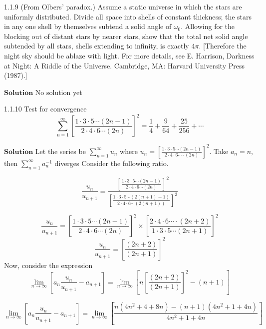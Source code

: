 \begin{mybox}{1.1.9}
(From Olbers' paradox.) Assume a static universe in which the stars are uniformly distributed. Divide all space into shells of constant thickness; the stars in any one shell by themselves subtend a solid angle of $\omega_{0}$. Allowing for the blocking out of distant stars by nearer stars, show that the total net solid angle subtended by all stars, shells extending to infinity, is exactly $4 \pi$. [Therefore the night sky should be ablaze with light. For more details, see E. Harrison, Darkness at Night: A Riddle of the Universe. Cambridge, MA: Harvard University Press (1987).]
\end{mybox}


$\boxed{\textbf{Solution}}$ No solution yet

\newpage



\begin{mybox}{1.1.10}
Test for convergence
$$
\sum_{n=1}^{\infty}\left[\frac{1 \cdot 3 \cdot 5 \cdots(2 n-1)}{2 \cdot 4 \cdot 6 \cdots(2 n)}\right]^{2}=\frac{1}{4}+\frac{9}{64}+\frac{25}{256}+\cdots
$$
\end{mybox}



$\boxed{\textbf{Solution}}$ Let the series be $\sum_{n=1}^{\infty} u_{n}$ where $u_{n}=\displaystyle \left[\frac{1 \cdot 3 \cdot 5 \cdots (2 n-1)}{2 \cdot 4 \cdot 6 \cdots  \cdot(2 n)}\right]^{2}$. Take $a_{n}=n,$ then $\sum_{n=1}^{\infty} a_{n}^{-1}$ diverges
Consider the following ratio.

$$
\frac{u_{n}}{u_{n+1}}=\frac{\left[\frac{1 \cdot 3 \cdot 5 \cdots (2 n-1)}{2 \cdot 4 \cdot 6 \cdots (2 n)}\right]^{2}}{\left[\frac{1 \cdot 3 \cdot 5 \cdots (2(n+1)-1)}{2 \cdot 4 \cdot 6 \cdots (2(n+1))}\right]^{2}}
$$

$$
\frac{u_{n}}{u_{n+1}}=\left[\frac{1 \cdot 3 \cdot 5 \cdots (2 n-1)}{2 \cdot 4 \cdot 6 \cdots (2 n)}\right]^{2} \times\left[\frac{2 \cdot 4 \cdot 6 \cdots  \cdot(2 n+2)}{1 \cdot 3 \cdot 5 \cdots (2 n+1)}\right]^{2}
$$
$$\frac{u_{n}}{u_{n+1}}=\left[\frac{(2 n+2)}{(2 n+1)}\right]^{2}$$
Now, consider the expression
$$
\lim_{n\rightarrow \infty}\left[a_{n} \frac{u_{n}}{u_{n+1}}-a_{n+1}\right]= \lim_{n\rightarrow \infty} \left[n\left[\frac{(2 n+2)}{(2 n+1)}\right]^{2}-(n+1)\right]
$$

$$
\lim_{n\rightarrow \infty}\left[a_{n} \frac{u_{n}}{u_{n+1}}-a_{n+1}\right]= \lim_{n\rightarrow \infty} \left[\frac{n\left(4 n^{2}+4+8 n\right)-(n+1)\left(4 n^{2}+1+4 n\right)}{4 n^{2}+1+4 n}\right]
$$

